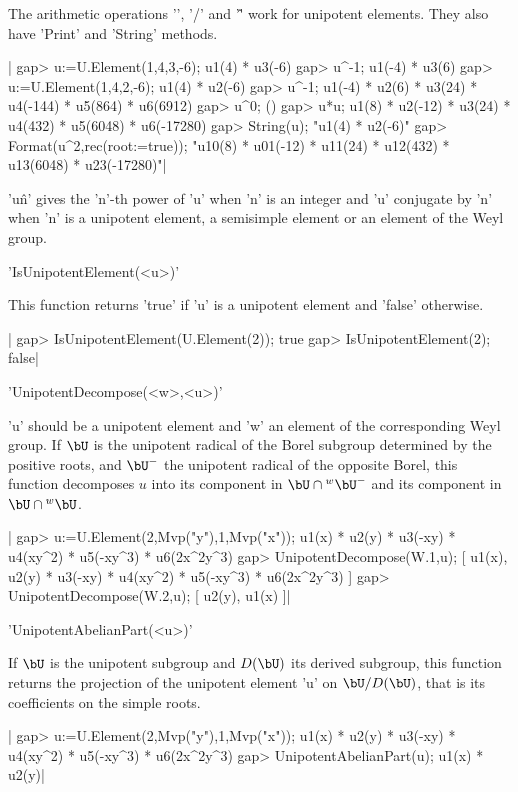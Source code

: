 The  arithmetic operations '\*', '/' and  '\^' work for unipotent elements.
They also have 'Print' and 'String' methods.

|    gap> u:=U.Element(1,4,3,-6);
    u1(4) * u3(-6)
    gap> u^-1;
    u1(-4) * u3(6)
    gap> u:=U.Element(1,4,2,-6);
    u1(4) * u2(-6)
    gap> u^-1;                  
    u1(-4) * u2(6) * u3(24) * u4(-144) * u5(864) * u6(6912)
    gap> u^0;
    ()
    gap> u*u;
    u1(8) * u2(-12) * u3(24) * u4(432) * u5(6048) * u6(-17280)
    gap> String(u);
    "u1(4) * u2(-6)"
    gap> Format(u^2,rec(root:=true));
    "u10(8) * u01(-12) * u11(24) * u12(432) * u13(6048) * u23(-17280)"|

'u\^n'  gives  the  'n'-th  power  of  'u'  when  'n'  is an integer and 'u'
conjugate  by 'n' when 'n' is a  unipotent element, a semisimple element or
an element of the Weyl group.


'IsUnipotentElement(<u>)'

This  function returns  'true' if  'u' is  a unipotent  element and 'false'
otherwise.

|    gap> IsUnipotentElement(U.Element(2));
    true
    gap> IsUnipotentElement(2);           
    false|


'UnipotentDecompose(<w>,<u>)'

'u'  should be a unipotent element and  'w' an element of the corresponding
Weyl  group.  If  $\bU$  is  the  unipotent  radical  of the Borel subgroup
determined  by the positive roots, and $\bU^-$ the unipotent radical of the
opposite  Borel,  this  function  decomposes  $u$  into  its  component  in
$\bU\cap{}^w\bU^-$ and its component in $\bU\cap{}^w\bU$.

|    gap> u:=U.Element(2,Mvp("y"),1,Mvp("x"));               
    u1(x) * u2(y) * u3(-xy) * u4(xy^2) * u5(-xy^3) * u6(2x^2y^3)
    gap> UnipotentDecompose(W.1,u);
    [ u1(x), u2(y) * u3(-xy) * u4(xy^2) * u5(-xy^3) * u6(2x^2y^3) ]
    gap> UnipotentDecompose(W.2,u);
    [ u2(y), u1(x) ]|


'UnipotentAbelianPart(<u>)'

If  $\bU$ is the unipotent subgroup and $D(\bU)$ its derived subgroup, this
function   returns  the  projection   of  the  unipotent   element  'u'  on
$\bU/D(\bU)$, that is its coefficients on the simple roots.

|    gap> u:=U.Element(2,Mvp("y"),1,Mvp("x"));
    u1(x) * u2(y) * u3(-xy) * u4(xy^2) * u5(-xy^3) * u6(2x^2y^3)
    gap> UnipotentAbelianPart(u);
    u1(x) * u2(y)|

